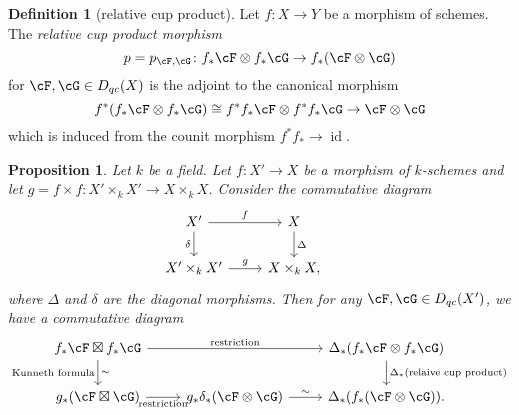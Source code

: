 \documentclass[12pt]{amsart}
\numberwithin{equation}{section}
\theoremstyle{plain}
\newtheorem{proposition}[theorem]{Proposition}
\theoremstyle{definition}
\newtheorem{definition}[theorem]{Definition}
\DeclareMathOperator{\id}{\mathrm{id}}
\begin{document}
\begin{definition}[relative cup product]\label{def:relative-cup-product}
    Let $f \colon X \to Y$ be a morphism of schemes. The \emph{relative cup product morphism} $$p = p_{\cF, \cG} \colon f_*\cF \otimes f_*\cG \to f_*(\cF \otimes \cG)$$ for $\cF, \cG \in D_{qc}(X)$ is the adjoint to the canonical morphism $$f^*(f_*\cF \otimes f_*\cG) \cong f^*f_*\cF \otimes f^*f_*\cG \to \cF \otimes \cG$$ which is induced from the counit morphism $f^*f_* \to \id$.
\end{definition}
\begin{proposition}\label{prop:Kunneth-and-cup-product}
    Let $k$ be a field.
    Let $f \colon X' \to X$ be a morphism of $k$-schemes and let $g = f\times f \colon X' \times_k X' \to X \times_k X$.
    Consider the commutative diagram
    \[
        \begin{tikzcd}
            X' \arrow[r,"f"]\arrow[d, "\delta"'] & X \arrow[d,"\Delta"]&\\
            X' \times_k X' \arrow[r, "g"]& X \times_k X,
        \end{tikzcd}
    \]
    where $\Delta$ and $\delta$ are the diagonal morphisms.
    Then for any $\cF, \cG \in D_{qc}(X')$, we have a commutative diagram
    \[
        \begin{tikzcd}
            f_*\cF \boxtimes f_*\cG \arrow[rr, "\text{restriction}"]\arrow[d, "\text{Kunneth formula}"', "\sim"]&&\Delta_*(f_*\cF \otimes f_*\cG)\arrow[d, "\Delta_*(\text{relaive cup product})"]\\
            g_*(\cF \boxtimes \cG) \arrow[r, "\text{restriction}"']&g_*\delta_*(\cF \otimes \cG) \arrow[r, "\sim", sloped]&\Delta_*(f_*(\cF \otimes \cG)).
        \end{tikzcd}
    \]
\end{proposition}
\end{document}

